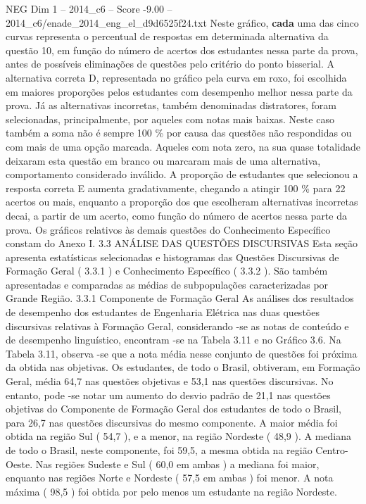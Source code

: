 \begin{textsample}{NEG Dim 1 – 2014\_c6 – Score -9.00 – 2014\_c6/enade\_2014\_eng\_el\_d9d6525f24.txt}
Neste gráfico, \textbf{cada} uma das cinco curvas representa o percentual de respostas em determinada alternativa da questão 10, em função do número de acertos dos estudantes nessa parte da prova, antes de possíveis eliminações de questões pelo critério do ponto bisserial.
A alternativa correta D, representada no gráfico pela curva em roxo, foi escolhida em maiores proporções pelos estudantes com desempenho melhor nessa parte da prova.
Já as alternativas incorretas, também denominadas distratores, foram selecionadas, principalmente, por aqueles com notas mais baixas.
Neste caso também a soma não é sempre 100 \% por causa das questões não respondidas ou com mais de uma opção marcada.
Aqueles com nota zero, na sua quase totalidade deixaram esta questão em branco ou marcaram mais de uma alternativa, comportamento considerado inválido.
A proporção de estudantes que selecionou a resposta correta E aumenta gradativamente, chegando a atingir 100 \% para 22 acertos ou mais, enquanto a proporção dos que escolheram alternativas incorretas decai, a partir de um acerto, como função do número de acertos nessa parte da prova.
Os gráficos relativos às demais questões do Conhecimento Específico constam do Anexo I. 3.3 ANÁLISE DAS QUESTÕES DISCURSIVAS Esta seção apresenta estatísticas selecionadas e histogramas das Questões Discursivas de Formação Geral ( 3.3.1 ) e Conhecimento Específico ( 3.3.2 ).
São também apresentadas e comparadas as médias de subpopulações caracterizadas por Grande Região. 3.3.1 Componente de Formação Geral As análises dos resultados de desempenho dos estudantes de Engenharia Elétrica nas duas questões discursivas relativas à Formação Geral, considerando -se as notas de conteúdo e de desempenho linguístico, encontram -se na Tabela 3.11 e no Gráfico 3.6.
Na Tabela 3.11, observa -se que a nota média nesse conjunto de questões foi próxima da obtida nas objetivas.
Os estudantes, de todo o Brasil, obtiveram, em Formação Geral, média 64,7 nas questões objetivas e 53,1 nas questões discursivas.
No entanto, pode -se notar um aumento do desvio padrão de 21,1 nas questões objetivas do Componente de Formação Geral dos estudantes de todo o Brasil, para 26,7 nas questões discursivas do mesmo componente.
A maior média foi obtida na região Sul ( 54,7 ), e a menor, na região Nordeste ( 48,9 ).
A mediana de todo o Brasil, neste componente, foi 59,5, a mesma obtida na região Centro-Oeste.
Nas regiões Sudeste e Sul ( 60,0 em ambas ) a mediana foi maior, enquanto nas regiões Norte e Nordeste ( 57,5 em ambas ) foi menor.
A nota máxima ( 98,5 ) foi obtida por pelo menos um estudante na região Nordeste.

\end{textsample}
